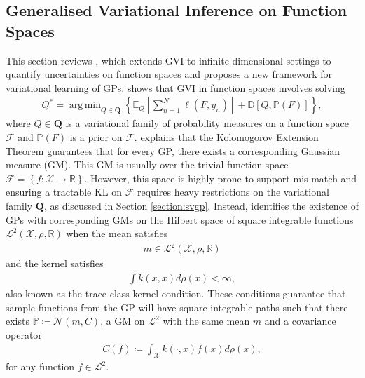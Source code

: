 \documentclass{article}
\DeclareMathOperator*{\argmin}{arg\,min}
\numberwithin{equation}{section}
\begin{document}
\subsection{Generalised Variational Inference on Function Spaces}
This section reviews \cite{wild2022generalized}, which extends GVI to infinite dimensional settings to quantify uncertainties on function spaces and proposes  a new framework for variational learning of GPs.
\cite{wild2022generalized} shows that GVI in function spaces involves solving
\begin{align}
    Q^* = \argmin_{Q \in \boldsymbol{Q}} \left\{\mathbb{E}_{Q}\left[\sum_{n=1}^{N}\ell(F, y_n)\right] + \mathbb{D}\left[Q, \mathbb{P}(F)\right]\right\},
    \label{gvi-posterior-in-fs}
\end{align}
where $Q \in \boldsymbol{Q}$ is a variational family of probability measures on a function space $\boldsymbol{\mathcal{F}}$ and $\mathbb{P}(F)$ is a prior on $\boldsymbol{\mathcal{F}}$.
\cite{wild2022generalized} explains that the Kolomogorov Extension Theorem guarantees that for every GP, there exists a corresponding Gaussian measure (GM). 
This GM is usually over the trivial function space $\boldsymbol{\mathcal{F}} = \left\{f: \mathcal{X} \rightarrow \mathbb{R}\right\}$.
However, this space is highly prone to support mis-match and ensuring a tractable KL on $\boldsymbol{\mathcal{F}}$ requires heavy restrictions on the variational family $\boldsymbol{Q}$, as discussed in Section \ref{section:svgp}.
Instead, \cite{wild2022generalized} identifies the existence of GPs with corresponding GMs on the Hilbert space of square integrable functions $\mathcal{L}^2\left(\mathcal{X}, \rho, \mathbb{R}\right)$ when the mean satisfies
\begin{align}
    m \in \mathcal{L}^2\left(\mathcal{X}, \rho, \mathbb{R}\right)
    \label{l2-mean}
\end{align}
and the kernel satisfies
\begin{align}
    \int k(x, x) d\rho(x) < \infty,
    \label{l2-kernel}
\end{align}
also known as the trace-class kernel condition.
These conditions guarantee that sample functions from the GP will have square-integrable paths such that there exists $\mathbb{P} \coloneqq \mathcal{N}(m, C)$, a GM on $\mathcal{L}^2$ with the same mean $m$ and a covariance operator
\begin{align}
    C(f) \coloneqq \int_{\mathcal{X}} k(\cdot, x) f(x) d\rho(x),
\end{align}
for any function $f \in \mathcal{L}^2$.
\end{document}

